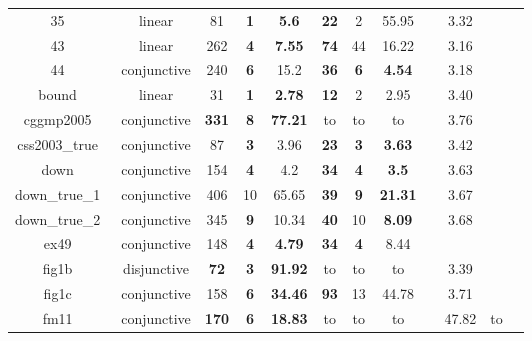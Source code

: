 \begin{table}[!h]
{\begin{tabular}{l c | c c c | c c c | c | c | c | c |}
\multicolumn{1}{|c|}{35~\cite{isil2013inductive}}				&linear			&81 	&\textbf{1} 		&\textbf{5.6}  		&\textbf{22}	&2 			&55.95 & \cmark  	&3.32	  		& \cmark		& \cmark \\
\multicolumn{1}{|c|}{43~\cite{isil2013inductive}}				&linear			&262	&\textbf{4} 		&\textbf{7.55}     	&\textbf{74}	&44			&16.22 & \cmark  	&3.16	  		& \cmark		& \cmark \\
\multicolumn{1}{|c|}{44~\cite{isil2013inductive}}				&conjunctive	&240	&\textbf{6} 		&15.2     			&\textbf{36}	&\textbf{6} &\textbf{4.54} & \cmark  	&3.18	  		& \cmark		& \cmark \\
\multicolumn{1}{|c|}{bound~\cite{gupta2009invgen}}				&linear 		&31 	&\textbf{1} 		&\textbf{2.78}    	&\textbf{12}	&2 			&2.95  & \cmark 	&3.40	  		& \cmark		& \cmark  \\
\multicolumn{1}{|c|}{cggmp2005~\cite{Dirk:SVCOMP:2016}}			&conjunctive	&\textbf{331}&\textbf{8}	&\textbf{77.21}		&to				&to			&to	& \cmark  	&3.76	  		& \cmark		& \cmark \\
\multicolumn{1}{|c|}{css2003\_true~\cite{Dirk:SVCOMP:2016}}		&conjunctive	&87 	&\textbf{3} 		&3.96       		&\textbf{23}	&\textbf{3} &\textbf{3.63} & \cmark 	&3.42	  		& \cmark 	& \cmark \\
\multicolumn{1}{|c|}{down~\cite{gupta2009invgen}}				&conjunctive	&154	&\textbf{4} 		&4.2      			&\textbf{34}	&\textbf{4}	&\textbf{3.5}  & \cmark	&3.63	  		& \cmark 	& \cmark \\
\multicolumn{1}{|c|}{down\_true\_1~\cite{Dirk:SVCOMP:2016}}		&conjunctive 	&406	&10					&65.65    			&\textbf{39}	&\textbf{9} &\textbf{21.31} & \cmark 	&3.67	  		& \cmark	& \cmark  \\
\multicolumn{1}{|c|}{down\_true\_2~\cite{Dirk:SVCOMP:2016}}		&conjunctive 	&345	&\textbf{9} 		&10.34    			&\textbf{40}	&10			&\textbf{8.09} & \cmark 	&3.68	  		& \cmark		& \cmark \\
\multicolumn{1}{|c|}{ex49~\cite{necla:benchmark}}				&conjunctive	&148	&\textbf{4} 		&\textbf{4.79}    	&\textbf{34}	&\textbf{4} &8.44 & \xmark 	&\xmark			& \cmark 	& \cmark  \\
\multicolumn{1}{|c|}{fig1b~\cite{zilu:repo}}					&disjunctive	&\textbf{72} &\textbf{3} 	&\textbf{91.92} 	&to 			&to 		&to & \xmark  	&3.39	  		& \cmark 	& \xmark	\\
\multicolumn{1}{|c|}{fig1c~\cite{zilu:repo}}					&conjunctive	&158	&\textbf{6}			&\textbf{34.46}		&\textbf{93}	&13			&44.78 & \xmark 	&3.71	  		& \xmark		& \xmark \\
\multicolumn{1}{|c|}{fm11~\cite{schwartznon}}					&conjunctive	&\textbf{170}	&\textbf{6} &\textbf{18.83}    	&to				&to			&to  & \cmark  	&47.82	  		& to		& \cmark \\

\end{tabular}}
\end{table}
